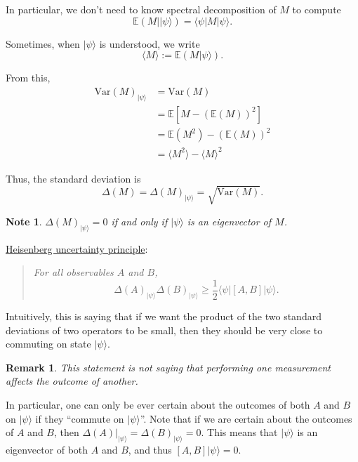 \documentclass{article}
\newtheorem*{note}{Note}
\newtheorem*{remark}{Remark}
\newcommand{\ket}[1]{|#1\rangle}
\newcommand{\braket}[2]{\langle#1|#2\rangle}
\begin{document}
In particular, we don't need to know spectral decomposition of $M$ to compute
$$ \mathbb E (M | \ket \psi) = \braket{\psi | M}{\psi}.$$

Sometimes, when $\ket \psi$ is understood, we write 
$$ \langle M \rangle \mathrel{:=} \mathbb E (M \ket \psi).$$

From this,
\begin{align*}
     \mathrm{Var}(M)_{\ket \psi} &= \mathrm{Var} (M) \\
                                 &= \mathbb E 
                                    \left[ M - \left(\mathbb E(M)\right)^2\right]\\
                                 &= \mathbb E(M^2) - (\mathbb E(M))^2\\
                                 &= \langle M^2 \rangle - \langle M \rangle^2
\end{align*}

Thus, the standard deviation is 
$$ \Delta (M) = \Delta(M)_{\ket \psi} = \sqrt {\mathrm{Var}(M)}.$$
\begin{note}
     $\Delta(M)_{\ket \psi} = 0$ if and only if $\ket \psi$ is an 
     eigenvector of $M$.
\end{note}

\begin{framed}
\underline{Heisenberg uncertainty principle}:
\begin{quote}
     \textit{ For all observables $A$ and $B$,
          $$ \Delta(A)_{\ket \psi} \Delta(B)_{\ket \psi} 
               \geq \frac{1}{2} \braket{\psi|[A, B]}{\psi}.$$
          }
\end{quote}
     
\end{framed}

Intuitively, this is saying that if we want the product of 
the two standard deviations of two operators to be small, then 
they should be very close to commuting on state $\ket \psi$.

\begin{remark}
     This statement is not saying
     that performing one measurement affects the outcome of another.
\end{remark}

In particular, one can only be ever certain about the outcomes of both
$A$ and $B$ on $\ket \psi$ if they ``commute on $\ket \psi$''.
Note that if we are certain about the outcomes
of $A$ and $B$, then $\Delta (A)|_{\ket \psi} = \Delta (B)_{\ket \psi} = 0$.
This means that $\ket \psi$ is an eigenvector of both $A$ and $B$, and thus
$[A, B]\ket \psi = 0$.
\end{document}
